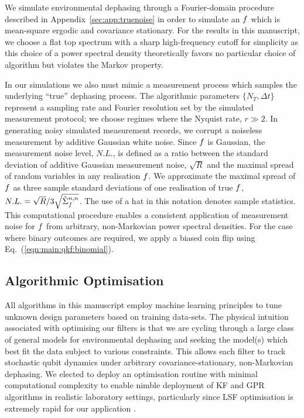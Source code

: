 We simulate environmental dephasing through a Fourier-domain procedure described in Appendix~\ref{sec:app:truenoise} \cite{soare2014} in order to simulate an $f$ which is mean-square ergodic and covariance stationary.  For the results in this manuscript, we choose a flat top spectrum with a sharp high-frequency cutoff for simplicity as this choice of a power spectral density theoretically favors no particular choice of algorithm but violates the Markov property. 

In our simulations we also must mimic a measurement process which samples the underlying ``true'' dephasing process.  The algorithmic parameters $\{N_T, \Delta t\} $ represent a sampling rate and Fourier resolution set by the simulated measurement protocol; we choose regimes where the Nyquist rate, $r \gg 2$. In generating noisy simulated measurement records, we corrupt a noiseless measurement by additive Gaussian white noise. Since $f$ is Gaussian, the measurement noise level, $N.L.$, is defined as a ratio between the standard deviation of additive Gaussian measurement noise, $\sqrt{R}$ and the maximal spread of random variables in any realisation $f$. We approximate the maximal spread of $f$ as three sample standard deviations of one realisation of true $f$, $N.L. = \sqrt{R}/3\sqrt{\hat{\Sigma}_f^{n,n}}$. The use of a hat in this notation denotes sample statistics. This computational procedure enables a consistent application of measurement noise for $f$ from arbitrary, non-Markovian power spectral densities. For the case where binary outcomes are required, we apply a biased coin flip using Eq.~(\ref {eqn:main:qkf:binomial}).

\subsection{Algorithmic Optimisation \label{sec:main:Optimisation}}

All algorithms in this manuscript employ machine learning principles to tune unknown design parameters based on training data-sets. The physical intuition associated with optimising our filters is that we are cycling through a large class of general models for environmental dephasing and seeking the model(s) which best fit the data subject to various constraints. This allows each filter to track stochastic qubit dynamics under arbitrary covariance-stationary, non-Markovian dephasing.  We elected to deploy an optimisation routine with minimal computational complexity to enable nimble deployment of KF and GPR algorithms in realistic laboratory settings, particularly since LSF optimisation is extremely rapid for our application \cite{mavadia2017}. 

